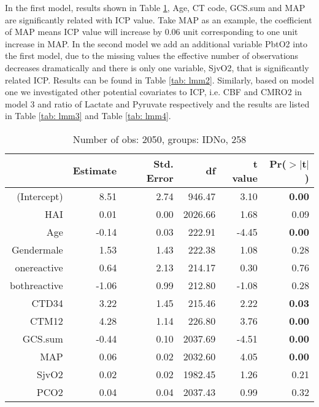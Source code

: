 \documentclass{article}
\begin{document}
In the first model, results shown in Table \ref{tab: lmm1}, Age, CT code, GCS.sum and MAP are significantly related with ICP value. Take MAP as an example, the coefficient of MAP means ICP value will increase by 0.06 unit corresponding to one unit increase in MAP. In the second model we add an additional variable PbtO2 into the first model, due to the missing values the effective number of observations decreases dramatically and there is only one variable, SjvO2, that is significantly related ICP. Results can be found in Table \ref{tab: lmm2}. Similarly, based on model one we investigated other potential covariates to ICP, i.e. CBF and CMRO2 in model 3 and ratio of Lactate and Pyruvate respectively and the results are listed in Table \ref{tab: lmm3} and Table \ref{tab: lmm4}. 

\begin{table}[H]
\centering
\caption{Number of obs: 2050, groups: IDNo, 258}
\label{tab: lmm1}
\begin{tabular}{rrrrrr}
  \hline
 & Estimate & Std. Error & df & t value & Pr($>$$|$t$|$) \\ 
  \hline
(Intercept) & 8.51 & 2.74 & 946.47 & 3.10 & {\bf 0.00} \\ 
  HAI & 0.01 & 0.00 & 2026.66 & 1.68 & 0.09 \\ 
  Age & -0.14 & 0.03 & 222.91 & -4.45 & {\bf 0.00} \\ 
  Gendermale & 1.53 & 1.43 & 222.38 & 1.08 & 0.28 \\ 
  onereactive & 0.64 & 2.13 & 214.17 & 0.30 & 0.76 \\ 
  bothreactive & -1.06 & 0.99 & 212.80 & -1.08 & 0.28 \\ 
  CTD34 & 3.22 & 1.45 & 215.46 & 2.22 & {\bf 0.03} \\ 
  CTM12 & 4.28 & 1.14 & 226.80 & 3.76 & {\bf 0.00} \\ 
  GCS.sum & -0.44 & 0.10 & 2037.69 & -4.51 & {\bf 0.00} \\ 
  MAP & 0.06 & 0.02 & 2032.60 & 4.05 & {\bf 0.00} \\ 
  SjvO2 & 0.02 & 0.02 & 1982.45 & 1.26 & 0.21 \\ 
  PCO2 & 0.04 & 0.04 & 2037.43 & 0.99 & 0.32 \\ 
   \hline
\end{tabular}
\end{table}
\end{document}
